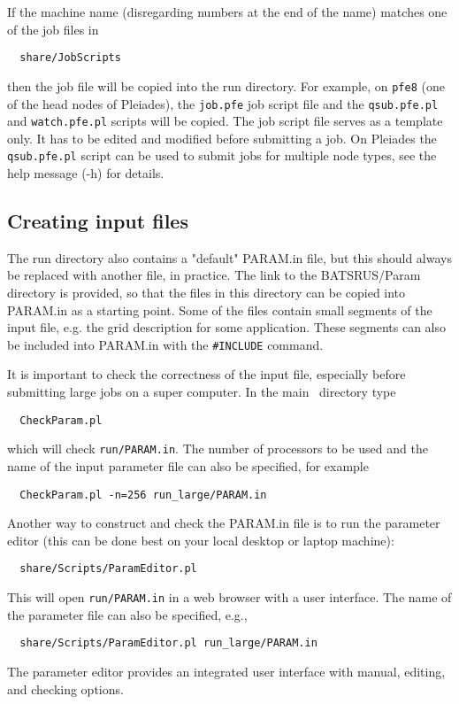 If the machine name (disregarding numbers at the end of the name) matches 
one of the job files in 
\begin{verbatim}
  share/JobScripts
\end{verbatim}
then the job file will be copied
into the run directory. For example, on {\tt pfe8} (one of the head nodes 
of Pleiades), the {\tt job.pfe} job script file and the {\tt qsub.pfe.pl}
and {\tt watch.pfe.pl} scripts will be copied. The job script file serves as a
template only. It has to be edited and modified before submitting a job.
On Pleiades the {\tt qsub.pfe.pl} script can be used to submit jobs for
multiple node types, see the help message (-h) for details.

\subsection{Creating input files}

The run directory also contains a "default" PARAM.in file, but this should always
be replaced with another file, in practice.
The link to the BATSRUS/Param directory is provided, so that the files in
this directory can be copied into PARAM.in as a starting point. 
Some of the files contain small segments of the input file, e.g. the grid
description for some application. These segments can also be included
into PARAM.in with the {\tt \#INCLUDE} command.

It is important to check the correctness of the input file, especially before submitting
large jobs on a super computer. In the main \BATSRUS\ directory type
\begin{verbatim}
  CheckParam.pl
\end{verbatim}
which will check {\tt run/PARAM.in}. The number of processors to be used and
the name of the input parameter file can also be specified, for example
\begin{verbatim}
  CheckParam.pl -n=256 run_large/PARAM.in
\end{verbatim}

Another way to construct and check the PARAM.in file is to run the parameter editor
(this can be done best on your local desktop or laptop machine):
\begin{verbatim}
  share/Scripts/ParamEditor.pl
\end{verbatim}
This will open {\tt run/PARAM.in} in a web browser with a user interface.
The name of the parameter file can also be specified, e.g., 
\begin{verbatim}
  share/Scripts/ParamEditor.pl run_large/PARAM.in
\end{verbatim}
The parameter editor provides an integrated user interface with manual, 
editing, and checking options.

